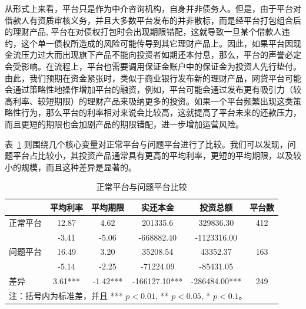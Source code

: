 \documentclass[lang=cn,11pt]{elegantpaper}
\begin{document}
从形式上来看，平台只是作为中介咨询机构，自身并非债务人。但是，由于平台对借款人有资质审核义务，并且大多数平台发布的并非散标，而是经平台打包组合后的理财产品, 平台在对债权打包时会出现期限错配，这就导致一旦某个借款人违约，这个单一债权所造成的风险可能传导到其它理财产品上。因此，如果平台因现金流压力过大而出现旗下产品不能向投资者如期还本付息，那么，平台的声誉必定会受影响。在流程上，平台也需要调用保证金账户中的保证金为投资人先行垫付。由此，我们预期在资金紧张时，类似于商业银行发布新的理财产品，网贷平台可能会通过策略性地操作增加平台的融资，例如，平台可能会通过发布更有吸引力（较高利率、较短期限）的理财产品来吸纳更多的投资。如果一个平台频繁出现这类策略性行为，那么平台的利率相对来说会比较高，这就提高了平台未来的还款压力，而且更短的期限也会加剧产品的期限错配，进一步增加运营风险。

表~\ref{tab:normalproblemsum} 则围绕几个核心变量对正常平台与问题平台进行了比较。我们可以发现，问题平台占比较小，其投资产品通常具有更高的平均利率，更短的平均期限，以及较小的规模，而且这种差异是显著的。

\begin{table}[htbp]
\centering
\caption{正常平台与问题平台比较\label{tab:normalproblemsum}}
\begin{tabular}{lccccc}
\toprule
      & 平均利率  & 平均期限  & 实还本金  & 投资总额  & 平台数 \\
\midrule
正常平台  & 12.87 & 4.62  & 201335.6 & 329836.30 & 412 \\
      & -3.41 & -5.06 & -668882.40 & -1123316.00 &  \\
问题平台  & 16.49 & 3.20   & 35208.54 & 43352.37 & 163 \\
      & -5.14 & -2.25 & -71224.09 & -85431.05 &  \\
差异    & 3.61*** & -1.42*** & -166127.10*** & -286484.00*** & 249 \\
\bottomrule
\multicolumn{6}{p{10cm}}{\scriptsize 注：括号内为标准差，并且 *** $p<0.01$, ** $p<0.05$, * $p<0.1$。}
\end{tabular}%
\end{table}%
\end{document}
